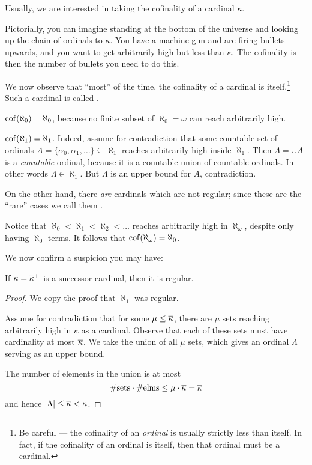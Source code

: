 Usually, we are interested in taking the cofinality of a cardinal $\kappa$.

Pictorially, you can imagine standing at the bottom of the universe and looking
up the chain of ordinals to $\kappa$.
You have a machine gun and are firing bullets upwards, and you want to get arbitrarily
high but less than $\kappa$.
The cofinality is then the number of bullets you need to do this.

We now observe that ``most'' of the time, the cofinality of a cardinal is itself.\footnote{Be
careful --- the cofinality of an \emph{ordinal} is usually strictly less than itself.
In fact, if the cofinality of an ordinal is itself, then that ordinal must be a cardinal.}
Such a cardinal is called .
\begin{example}
	$\operatorname{cof}(\aleph_0) = \aleph_0$, because no finite subset of
	$\aleph_ 0 = \omega$ can reach arbitrarily high.
\end{example}
\begin{example}
	$\operatorname{cof}(\aleph_1) = \aleph_1$.
	Indeed, assume for contradiction that some countable
	set of ordinals $A = \{ \alpha_0, \alpha_1, \dots \} \subseteq \aleph_1$
	reaches arbitrarily high inside $\aleph_1$.
	Then $\Lambda = \cup A$ is a \emph{countable} ordinal,
	because it is a countable union of countable ordinals.
	In other words $\Lambda \in \aleph_1$.
	But $\Lambda$ is an upper bound for $A$, contradiction.
\end{example}
On the other hand, there \emph{are} cardinals which are not regular;
since these are the ``rare'' cases we call them .
\begin{example}
	Notice that $\aleph_0 < \aleph_1 < \aleph_2 < \dots$ reaches
	arbitrarily high in $\aleph_\omega$, despite only having $\aleph_0$ terms.
	It follows that $\operatorname{cof}(\aleph_\omega) = \aleph_0$.
\end{example}

We now confirm a suspicion you may have:
\begin{theorem}
	If $\kappa = \overline\kappa^+$ is a successor cardinal,
	then it is regular.
\end{theorem}
\begin{proof}
	We copy the proof that $\aleph_1$ was regular.

	Assume for contradiction that for some $\mu \le \overline\kappa$,
	there are $\mu$ sets reaching arbitrarily high in $\kappa$ as a cardinal.
	Observe that each of these sets must have cardinality at most $\overline\kappa$.
	We take the union of all $\mu$ sets, which gives an ordinal $\Lambda$
	serving as an upper bound.

	The number of elements in the union is at most
	\[ \#\text{sets} \cdot \#\text{elms}
		\le \mu \cdot \overline\kappa = \overline\kappa \]
	and hence $\left\lvert \Lambda \right\rvert \le \overline\kappa < \kappa$.
\end{proof}

